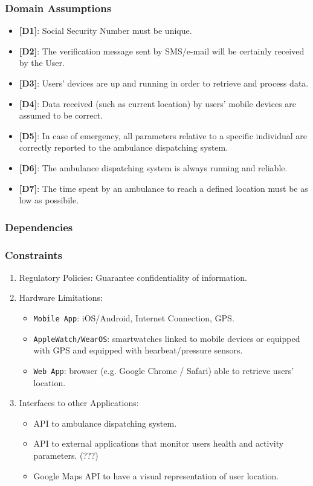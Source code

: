 \documentclass[12pt,a4paper]{article}
\begin{document}
			\subsubsection{Domain Assumptions}
			\begin{itemize} 
				\item {\textbf[}\textbf{D1}{\textbf]}: Social Security Number must be unique.
				\item {\textbf[}\textbf{D2}{\textbf]}: The verification message sent by SMS/e-mail will be certainly received by the User.
		        \item {\textbf[}\textbf{D3}{\textbf]}: Users' devices are up and running in order to retrieve and process data. 
		        \item {\textbf[}\textbf{D4}{\textbf]}: Data received (such as current location) by users' mobile devices are assumed to be correct.
		        \item {\textbf[}\textbf{D5}{\textbf]}: In case of emergency, all parameters relative to a specific individual are correctly reported to the ambulance dispatching system.
		        \item {\textbf[}\textbf{D6}{\textbf]}: The ambulance dispatching system is always running and reliable.
		        \item {\textbf[}\textbf{D7}{\textbf]}: The time spent by an ambulance to reach a defined location must be as low as possibile.
			\end{itemize}
			\subsubsection{Dependencies}
			\subsubsection{Constraints}
				\begin{enumerate}
					\item Regulatory Policies:
							Guarantee confidentiality of information.
					\item Hardware Limitations: 
						\begin{itemize}
							\item \texttt{Mobile App}: iOS/Android, Internet Connection, GPS.
							\item \texttt{AppleWatch/WearOS}: smartwatches linked to mobile devices or equipped with GPS and equipped with hearbeat/pressure sensors.
							\item \texttt{Web App}: browser (e.g. Google Chrome / Safari) able to retrieve users' location.
						\end{itemize}
					\item Interfaces to other Applications: 
						\begin{itemize}
							\item API to ambulance dispatching system.
							\item API to external applications that monitor users health and activity parameters. (???)
						    \item Google Maps API to have a visual representation of user location.
						\end{itemize}
				\end{enumerate}
		
\end{document}
